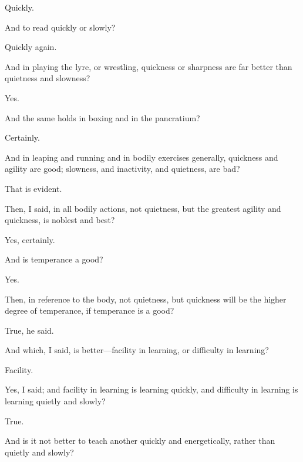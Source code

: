 \documentclass[11pt,letter]{article}
\begin{document}
\par  Quickly.

\par  And to read quickly or slowly?

\par  Quickly again.

\par  And in playing the lyre, or wrestling, quickness or sharpness are far better than quietness and slowness?

\par  Yes.

\par  And the same holds in boxing and in the pancratium?

\par  Certainly.

\par  And in leaping and running and in bodily exercises generally, quickness and agility are good; slowness, and inactivity, and quietness, are bad?

\par  That is evident.

\par  Then, I said, in all bodily actions, not quietness, but the greatest agility and quickness, is noblest and best?

\par  Yes, certainly.

\par  And is temperance a good?

\par  Yes.

\par  Then, in reference to the body, not quietness, but quickness will be the higher degree of temperance, if temperance is a good?

\par  True, he said.

\par  And which, I said, is better—facility in learning, or difficulty in learning?

\par  Facility.

\par  Yes, I said; and facility in learning is learning quickly, and difficulty in learning is learning quietly and slowly?

\par  True.

\par  And is it not better to teach another quickly and energetically, rather than quietly and slowly?
\end{document}
